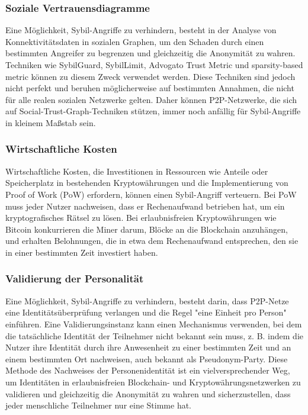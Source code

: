 \documentclass[ngerman]{scrreprt}
\begin{document}
\subsubsection{Soziale Vertrauensdiagramme}
Eine Möglichkeit, Sybil-Angriffe zu verhindern, besteht in der Analyse von Konnektivitätsdaten in sozialen Graphen, um den Schaden durch einen bestimmten Angreifer zu begrenzen und gleichzeitig die Anonymität zu wahren. Techniken wie SybilGuard, SybilLimit, Advogato Trust Metric und sparsity-based metric können zu diesem Zweck verwendet werden. Diese Techniken sind jedoch nicht perfekt und beruhen möglicherweise auf bestimmten Annahmen, die nicht für alle realen sozialen Netzwerke gelten. Daher können P2P-Netzwerke, die sich auf Social-Trust-Graph-Techniken stützen, immer noch anfällig für Sybil-Angriffe in kleinem Maßstab sein.
\subsubsection{Wirtschaftliche Kosten}
Wirtschaftliche Kosten, die Investitionen in Ressourcen wie Anteile oder Speicherplatz in bestehenden Kryptowährungen und die Implementierung von Proof of Work (PoW) erfordern, können einen Sybil-Angriff verteuern. Bei PoW muss jeder Nutzer nachweisen, dass er Rechenaufwand betrieben hat, um ein kryptografisches Rätsel zu lösen. Bei erlaubnisfreien Kryptowährungen wie Bitcoin konkurrieren die Miner darum, Blöcke an die Blockchain anzuhängen, und erhalten Belohnungen, die in etwa dem Rechenaufwand entsprechen, den sie in einer bestimmten Zeit investiert haben.
\subsubsection{Validierung der Personalität}
Eine Möglichkeit, Sybil-Angriffe zu verhindern, besteht darin, dass P2P-Netze eine Identitätsüberprüfung verlangen und die Regel "eine Einheit pro Person" einführen. Eine Validierungsinstanz kann einen Mechanismus verwenden, bei dem die tatsächliche Identität der Teilnehmer nicht bekannt sein muss, z. B. indem die Nutzer ihre Identität durch ihre Anwesenheit zu einer bestimmten Zeit und an einem bestimmten Ort nachweisen, auch bekannt als Pseudonym-Party. Diese Methode des Nachweises der Personenidentität ist ein vielversprechender Weg, um Identitäten in erlaubnisfreien Blockchain- und Kryptowährungsnetzwerken zu validieren und gleichzeitig die Anonymität zu wahren und sicherzustellen, dass jeder menschliche Teilnehmer nur eine Stimme hat.
\end{document}
